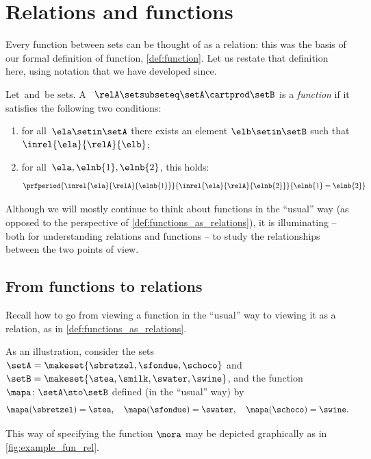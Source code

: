 
\section{Relations and functions}

Every function between sets can be thought of as a relation: this was the basis of our formal definition of function, \cref{def:function}.
Let us restate that definition here, using notation that we have developed since.

\begin{ctdefinition}
    \label{def:functions_as_relations}
    Let~\setA and~\setB be sets.
    A ~$\relA \setsubseteq \setA \cartprod \setB$ is a \emph{function} if it satisfies the following two conditions:
    \begin{enumerate}
        \item for all~$\ela \setin \setA$ there exists an element $\elb \setin \setB$ such that $\inrel{\ela}{\relA}{\elb}$;
        \item for all~$\ela, \elnb{1}, \elnb{2}$, this holds:
              \begin{equation}
                  \prfperiod{
                      \inrel{\ela}{\relA}{\elnb{1}}
                  }{
                      \inrel{\ela}{\relA}{\elnb{2}}
                  }{
                      \elnb{1} = \elnb{2}
                  }
              \end{equation}
    \end{enumerate}
\end{ctdefinition}

Although we will mostly continue to think about functions in the ``usual'' way (as opposed to the perspective of \cref{def:functions_as_relations}), it is illuminating -- both for understanding relations and functions -- to study the relationships between the two points of view.

\subsection{From functions to relations}

Recall how to go from viewing a function in the ``usual'' way to viewing it as a relation, as in \cref{def:functions_as_relations}.

As an illustration, consider the sets~$\setA = \makeset{ \sbretzel, \sfondue, \schoco }$ and~$\setB = \makeset{ \stea, \smilk, \swater, \swine }$, and the function~$\mapa \colon \setA \sto \setB$ defined (in the ``usual'' way) by
\begin{equation}
    \mapa (\sbretzel) = \stea, \quad \mapa (\sfondue) = \swater, \quad \mapa(\schoco) = \swine.
\end{equation}
\begin{marginfigure}
    \centering
    \caption{Visualization of the function \cref{eq:fun-rel}.}
    \label{fig:example_fun_rel}
\end{marginfigure}
This way of specifying the function $\mora$ may be depicted graphically as in \cref{fig:example_fun_rel}.


